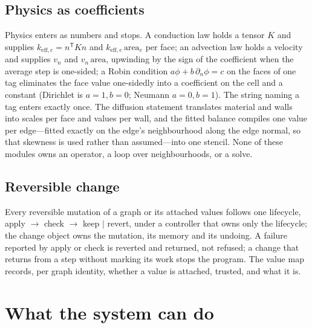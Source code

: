 \documentclass[11pt,a4paper]{article}
\newcommand{\tr}{^{\mathsf T}}
\begin{document}
\subsection{Physics as coefficients}

Physics enters as numbers and stops. A conduction law holds a tensor $K$ and supplies $k_{\text{eff},e} = n\tr Kn$ and $k_{\text{eff},e}\,\text{area}_e$ per face; an advection law holds a velocity and supplies $v_n$ and $v_n\,\text{area}$, upwinding by the sign of the coefficient when the average step is one-sided; a Robin condition $a\phi + b\,\partial_n\phi = c$ on the faces of one tag eliminates the face value one-sidedly into a coefficient on the cell and a constant (Dirichlet is $a=1,b=0$; Neumann $a=0,b=1$). The string naming a tag enters exactly once. The diffusion statement translates material and walls into scales per face and values per wall, and the fitted balance compiles one value per edge---fitted exactly on the edge's neighbourhood along the edge normal, so that skewness is used rather than assumed---into one stencil. None of these modules owns an operator, a loop over neighbourhoods, or a solve.

\subsection{Reversible change}

Every reversible mutation of a graph or its attached values follows one lifecycle, apply $\to$ check $\to$ keep $\mid$ revert, under a controller that owns only the lifecycle; the change object owns the mutation, its memory and its undoing. A failure reported by apply or check is reverted and returned, not refused; a change that returns from a step without marking its work stops the program. The value map records, per graph identity, whether a value is attached, trusted, and what it is.

\section{What the system can do}\label{sec:features}
\end{document}
